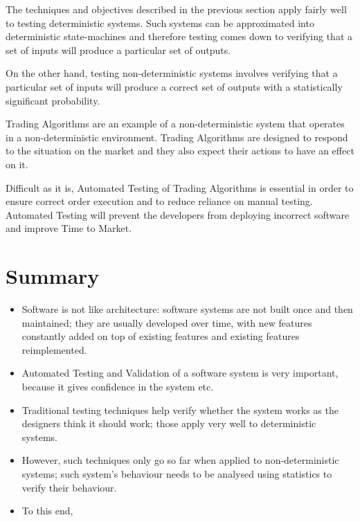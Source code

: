 The techniques and objectives described in the previous section apply fairly well to testing deterministic systems. Such systems can be approximated into deterministic state-machines and therefore testing comes down to verifying that a set of inputs will produce a particular set of outputs.

On the other hand, testing non-deterministic systems involves verifying that a particular set of inputs will produce a correct set of outputs with a statistically significant probability.

Trading Algorithms are an example of a non-deterministic system that operates in a non-deterministic environment. Trading Algorithms are designed to respond to the situation on the market and they also expect their actions to have an effect on it.

Difficult as it is, Automated Testing of Trading Algorithms is essential in order to ensure correct order execution and to reduce reliance on manual testing. Automated Testing will prevent the developers from deploying incorrect software and improve Time to Market.

\section{Summary}
\begin{itemize}
\item Software is not like architecture: software systems are not built once and then maintained; they are usually developed over time, with new features constantly added on top of existing features and existing features reimplemented.
\item Automated Testing and Validation of a software system is very important, because it gives confidence in the system etc.
\item Traditional testing techniques help verify whether the system works as the designers think it should work; those apply very well to deterministic systems.
\item However, such techniques only go so far when applied to non-deterministic systems; such system's behaviour needs to be analysed using statistics to verify their behaviour.
\item To this end, 
\end{itemize}